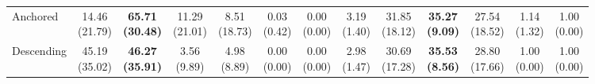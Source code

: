 {\begin{tabular}{l|cccccc|cccccc}
Anchored & \makecell{14.46 \\ (21.79)} & {\cellcolor[HTML]{C8E6C9}} \bfseries \makecell{65.71 \\ (30.48)} & \makecell{11.29 \\ (21.01)} & \makecell{8.51 \\ (18.73)} & \makecell{0.03 \\ (0.42)} & \makecell{0.00 \\ (0.00)} & \makecell{3.19 \\ (1.40)} & {\cellcolor[HTML]{C8E6C9}} \makecell{31.85 \\ (18.12)} & \bfseries \makecell{35.27 \\ (9.09)} & \makecell{27.54 \\ (18.52)} & \makecell{1.14 \\ (1.32)} & \makecell{1.00 \\ (0.00)} \\
Descending & \makecell{45.19 \\ (35.02)} & {\cellcolor[HTML]{C8E6C9}} \bfseries \makecell{46.27 \\ (35.91)} & \makecell{3.56 \\ (9.89)} & \makecell{4.98 \\ (8.89)} & \makecell{0.00 \\ (0.00)} & \makecell{0.00 \\ (0.00)} & \makecell{2.98 \\ (1.47)} & {\cellcolor[HTML]{C8E6C9}} \makecell{30.69 \\ (17.28)} & \bfseries \makecell{35.53 \\ (8.56)} & \makecell{28.80 \\ (17.66)} & \makecell{1.00 \\ (0.00)} & \makecell{1.00 \\ (0.00)} \\
\bottomrule
\end{tabular}
}%
